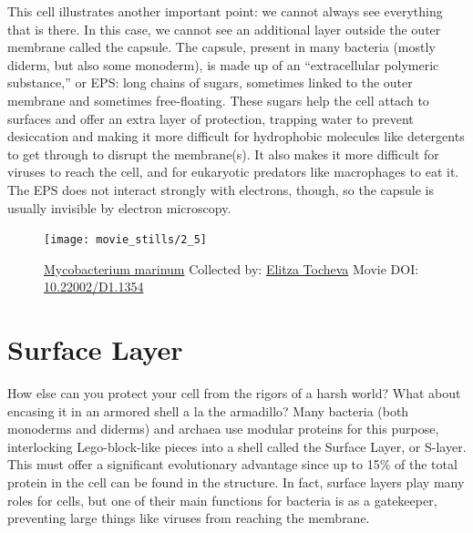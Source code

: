 \documentclass[]{tufte-book}
\begin{document}
This cell illustrates another important point: we cannot always see
everything that is there. In this case, we cannot see an additional
layer outside the outer membrane called the capsule. The capsule,
present in many bacteria (mostly diderm, but also some monoderm), is
made up of an ``extracellular polymeric substance,'' or EPS: long chains
of sugars, sometimes linked to the outer membrane and sometimes
free-floating. These sugars help the cell attach to surfaces and offer
an extra layer of protection, trapping water to prevent desiccation and
making it more difficult for hydrophobic molecules like detergents to
get through to disrupt the membrane(s). It also makes it more difficult
for viruses to reach the cell, and for eukaryotic predators like
macrophages to eat it. The EPS does not interact strongly with
electrons, though, so the capsule is usually invisible by electron
microscopy.





\begin{figure}
\texttt{[image: movie\_stills/2\_5]} \caption[\protect\hyperlink{tree}{Mycobacterium marinum} Collected by:
\protect\hyperlink{elitza_tocheva}{Elitza Tocheva} Movie DOI:
\href{https://doi.org/10.22002/D1.1354}{10.22002/D1.1354}]{\protect\hyperlink{tree}{Mycobacterium marinum} Collected by:
\protect\hyperlink{elitza_tocheva}{Elitza Tocheva} Movie DOI:
\href{https://doi.org/10.22002/D1.1354}{10.22002/D1.1354}}\label{fig:2-5}
\end{figure}

\section{Surface Layer}\label{surface-layer}

How else can you protect your cell from the rigors of a harsh world?
What about encasing it in an armored shell a la the armadillo? Many
bacteria (both monoderms and diderms) and archaea use modular proteins
for this purpose, interlocking Lego-block-like pieces into a shell
called the Surface Layer, or S-layer. This must offer a significant
evolutionary advantage since up to 15\% of the total protein in the cell
can be found in the structure. In fact, surface layers play many roles
for cells, but one of their main functions for bacteria is as a
gatekeeper, preventing large things like viruses from reaching the
membrane.
\end{document}
